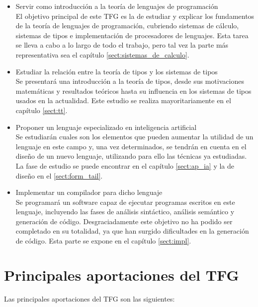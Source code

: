 \begin{itemize}
	\item Servir como introducción a la teoría de lenguajes de programación\\
	
	El objetivo principal de este TFG es la de estudiar y explicar los fundamentos de la teoría de lenguajes de programación, cubriendo sistemas de cálculo, sistemas de tipos e implementación de procesadores de lenguajes. Esta tarea se lleva a cabo a lo largo de todo el trabajo, pero tal vez la parte más representativa sea el capítulo \ref{sect:sistemas_de_calculo}.\\
	
	\item Estudiar la relación entre la teoría de tipos y los sistemas de tipos\\
	
	Se presentará una introducción a la teoría de tipos, desde sus motivaciones matemáticas y resultados teóricos hasta su influencia en los sistemas de tipos usados en la actualidad.
	Este estudio se realiza mayoritariamente en el capítulo \ref{sect:tt}.\\
	
	\item Proponer un lenguaje especializado en inteligencia artificial\\
	
	Se estudiarán cuales son los elementos que pueden aumentar la utilidad de un lenguaje en este campo y, una vez determinados, se tendrán en cuenta en el diseño de un nuevo lenguaje, utilizando para ello las técnicas ya estudiadas. La fase de estudio se puede encontrar en el capítulo \ref{sect:ap_ia} y la de diseño en el \ref{sect:form_tail}.\\
	
	\item Implementar un compilador para dicho lenguaje\\
	
	Se programará un software capaz de ejecutar programas escritos en este lenguaje, incluyendo las fases de análisis sintáctico, análisis semántico y generación de código. Desgraciadamente este objetivo no ha podido ser completado en su totalidad, ya que han surgido dificultades en la generación de código. Esta parte se expone en el capítulo \ref{sect:impl}.\\
\end{itemize}

\section{Principales aportaciones del TFG}
Las principales aportaciones del TFG son las siguientes:\\


